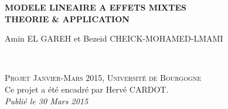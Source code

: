 \documentclass[11pt,fleqn]{book} %
\begin{document}
\let\cleardoublepage\clearpage


\begingroup
\thispagestyle{empty}
\centering
\vspace*{5cm}
\par\normalfont\fontsize{35}{35}\sffamily\selectfont
\textbf{MODELE LINEAIRE A EFFETS MIXTES\\ THEORIE \& APPLICATION }\\
{\LARGE }\par %
\vspace*{1cm}
{\Huge Amin EL GAREH et Bezeid CHEICK-MOHAMED-LMAMI}\par %
\endgroup


\newpage
~\vfill
\thispagestyle{empty}


\noindent \textsc{Projet Janvier-Mars 2015, Université de Bourgogne}\\

\noindent Ce projet a été encadré par Hervé CARDOT.\\ %

\noindent \textit{Publié le 30 Mars 2015} %



\pagestyle{empty} %

\renewcommand\contentsname{Table des Matières}
\renewcommand{\bibname}{Bibliographie}
\tableofcontents%


\pagestyle{fancy} %
\end{document}

